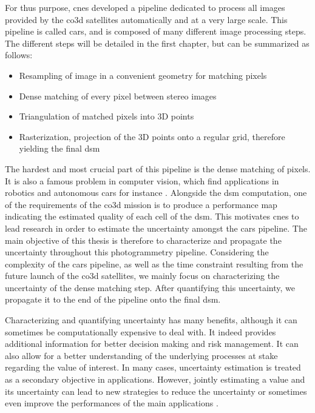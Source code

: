 For thus purpose, \acrshort{cnes} developed a pipeline dedicated to process all images provided by the \acrshort{co3d} satellites automatically and at a very large scale. This pipeline is called \acrfull{cars}, and is composed of many different image processing steps. The different steps will be detailed in the first chapter, but can be summarized as follows:
\begin{itemize}
    \item Resampling of image in a convenient geometry for matching pixels
    \item Dense matching of every pixel between stereo images
    \item Triangulation of matched pixels into 3D points
    \item Rasterization, \ie projection of the 3D points onto a regular grid, therefore yielding the final \acrshort{dsm} 
\end{itemize}
The hardest and most crucial part of this pipeline is the dense matching of pixels. It is also a famous problem in computer vision, which find applications in robotics and autonomous cars for instance \cite{geiger_vision_2013}. Alongside the \acrshort{dsm} computation, one of the requirements of the \acrshort{co3d} mission is to produce a performance map indicating the estimated quality of each cell of the \acrshort{dsm}. This motivates \acrshort{cnes} to lead research in order to estimate the uncertainty amongst the \acrshort{cars} pipeline. The main objective of this thesis is therefore to characterize and propagate the uncertainty throughout this photogrammetry pipeline. Considering the complexity of the \acrshort{cars} pipeline, as well as the time constraint resulting from the future launch of the \acrshort{co3d} satellites, we mainly focus on characterizing the uncertainty of the dense matching step. After quantifying this uncertainty, we propagate it to the end of the pipeline onto the final \acrshort{dsm}.

Characterizing and quantifying uncertainty has many benefits, although it can sometimes be computationally expensive to deal with. It indeed provides additional information for better decision making and risk management. It can also allow for a better understanding of the underlying processes at stake regarding the value of interest. In many cases, uncertainty estimation is treated as a secondary objective in applications. However, jointly estimating a value and its uncertainty can lead to new strategies to reduce the uncertainty or sometimes even improve the performances of the main applications \cite{qin_uncertainty-guided_2022,chen_learning_2023,jiang_unsupervised_2024}.

